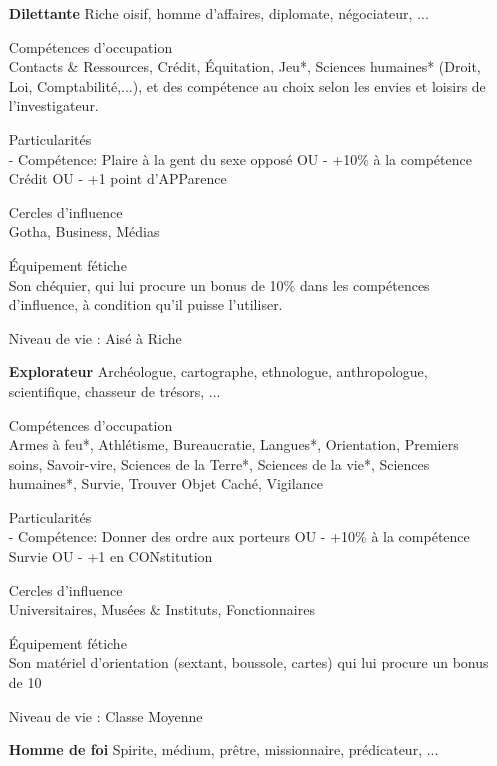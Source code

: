 \documentclass[11pt,twoside,a4paper]{article}
\begin{document}
\begin{multicols*}{2}
\begin{itemize}
	Niveau de vie : 
	Pauvre {\`a} Ais{\'e}

\columnbreak

	\item[\textbf{Dilettante}] Riche oisif, homme d'affaires, diplomate, n{\'e}gociateur, ...
	
	Comp{\'e}tences d'occupation~\\
	Contacts \& Ressources, Cr{\'e}dit, {\'E}quitation, Jeu*, Sciences humaines* (Droit, Loi, Comptabilit{\'e},...), et des comp{\'e}tence au choix selon les envies et loisirs de l'investigateur.
	
	Particularit{\'e}s~\\
	- Comp{\'e}tence: Plaire {\`a} la gent du sexe oppos{\'e} OU
	- +10\% {\`a} la comp{\'e}tence Cr{\'e}dit OU
	- +1 point d'APParence
	
	Cercles d'influence~\\
	Gotha, Business, M{\'e}dias
	
	{\'E}quipement f{\'e}tiche~\\
	Son ch{\'e}quier, qui lui procure un bonus de 10\% dans les comp{\'e}tences d'influence, {\`a} condition qu'il puisse l'utiliser.
	
	Niveau de vie : 
	Ais{\'e} {\`a} Riche

	\item[\textbf{Explorateur}] Arch{\'e}ologue, cartographe, ethnologue, anthropologue, scientifique, chasseur de tr{\'e}sors, ...
	
	Comp{\'e}tences d'occupation~\\
	Armes {\`a} feu*, Athl{\'e}tisme, Bureaucratie, Langues*, Orientation, Premiers soins, Savoir-vire, Sciences de la Terre*, Sciences de la vie*, Sciences humaines*, Survie, Trouver Objet Cach{\'e}, Vigilance
	
	Particularit{\'e}s~\\
	- Comp{\'e}tence: Donner des ordre aux porteurs OU
	- +10\% {\`a} la comp{\'e}tence Survie OU
	- +1 en CONstitution
	
	Cercles d'influence~\\
	Universitaires, Mus{\'e}es \& Instituts, Fonctionnaires
	
	{\'E}quipement f{\'e}tiche~\\
	Son mat{\'e}riel d'orientation (sextant, boussole, cartes) qui lui procure un bonus de 10%
	
	Niveau de vie : 
	Classe Moyenne

	\item[\textbf{Homme de foi}] Spirite, m{\'e}dium, pr{\^e}tre, missionnaire, pr{\'e}dicateur, ...
	

\end{itemize}
\end{multicols*}
\end{document}
